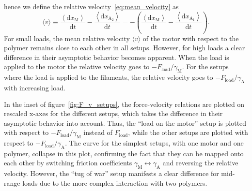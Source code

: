 \documentclass[aps,pre,twocolumn,showpacs,showkeys,superscriptaddress,floatfix]{revtex4-1}
\newcommand{\rmd}{{\mathrm d}}
\begin{document}
hence we define the relative velocity~\eqref{eq:mean_velocity} as 
\[
\langle v \rangle 
\equiv \frac{ \left\langle \rmd x_\text{M} \right\rangle }{ \rmd t }
- \frac{ \left\langle \rmd x_{\text{A}_2} \right\rangle }{ \rmd t }
= - \left( \frac{ \left\langle \rmd x_\text{M} \right\rangle }{ \rmd t }
- \frac{ \left\langle \rmd x_{\text{A}_1} \right\rangle }{ \rmd t } \right) .
\]
For small loads, the mean relative velocity $\langle v \rangle$ of the motor with respect to the polymer remains close to each other in all setups.
However, for high loads a clear difference in their asymptotic behavior becomes apparent.
When the load is applied to the motor the relative velocity goes to $ - F_\text{load} / \gamma_\text{M}$.
For the setups where the load is applied to the filaments, the relative velocity goes to $ - F_\text{load} / \gamma_\text{A}$ with increasing load.

In the inset of figure~\ref{fig:F_v_setups}, 
the force-velocity relations are plotted on rescaled x-axes for the different setups, 
which takes the difference in their asymptotic behavior into account. 
Thus, the ``load on the motor'' setup is plotted with respect to $ - F_\text{load} / \gamma_\text{M}$ instead of $F_\text{load}$,
while the other setups are plotted with respect to $ - F_\text{load} / \gamma_\text{A}$.
The curve for the simplest setups, with one motor and one polymer, collapse in this plot, 
confirming the fact that they can be mapped onto each other by switching friction coefficients $\gamma_\text{M} \leftrightarrow \gamma_\text{A}$ 
and reversing the relative velocity. 
However, the ``tug of war'' setup manifests a clear difference for mid-range loads due to the more complex interaction with two polymers. 
\end{document}
